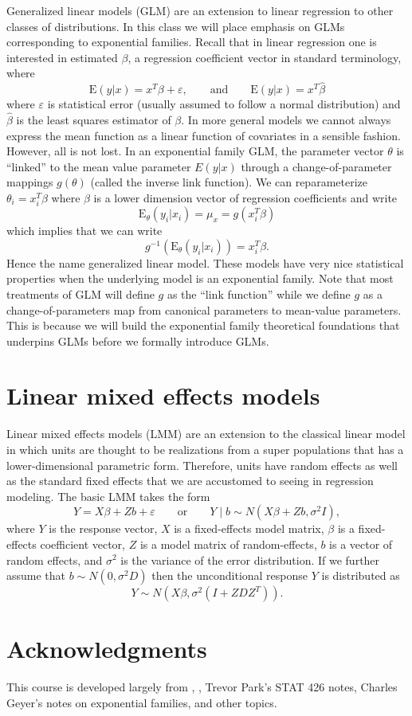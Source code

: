 \documentclass[12pt]{article}
\newcommand{\E}{\mathrm{E}}
\DeclareMathOperator{\E}{E}
\begin{document}
Generalized linear models (GLM) are an extension to linear regression to other classes of distributions. In this class we will place emphasis on GLMs corresponding to exponential families. Recall that in linear regression one is interested in estimated $\beta$, a regression coefficient vector in standard terminology, where 
$$
  \E(y|x) = x^T\beta + \varepsilon, 
    \qquad \text{and} \qquad 
  \hat{\E}(y|x) = x^T\hat\beta
$$
where $\varepsilon$ is statistical error (usually assumed to follow a normal distribution) and $\hat\beta$ is the least squares estimator of $\beta$. In more general models we cannot always express the mean function as a linear function of covariates in a sensible fashion. However, all is not lost. In an exponential family GLM, the parameter vector $\theta$ is ``linked'' to the mean value parameter $E(y|x)$ through a change-of-parameter mappings $g(\theta)$ (called the inverse link function). We can reparameterize $\theta_i = x_i^T\beta$ where $\beta$ is a lower dimension vector of regression coefficients and write
$$
 \E_\theta(y_i|x_i) = \mu_x = g(x_i^T\beta) 
$$
which implies that we can write
$$
  g^{-1}\left(\E_\theta(y_i|x_i)\right) = x_i^T\beta.
$$
Hence the name generalized linear model. These models have very nice statistical properties when the underlying model is an exponential family. Note that most treatments of GLM will define $g$ as the ``link function'' while we define $g$ as a change-of-parameters map from canonical parameters to mean-value parameters. This is because we will build the exponential family theoretical foundations that underpins GLMs before we formally introduce GLMs.


\section*{Linear mixed effects models}

Linear mixed effects models (LMM) are an extension to the classical linear model in which units are thought to be realizations from a super populations that has a lower-dimensional parametric form. Therefore, units have random effects as well as the standard fixed effects that we are accustomed to seeing in regression modeling. The basic LMM takes the form
$$
  Y = X\beta + Zb + \varepsilon \qquad \text{or} \qquad Y\mid b \sim N(X\beta + Zb, \sigma^2I),
$$
where $Y$ is the response vector, $X$ is a fixed-effects model matrix, $\beta$ is a fixed-effects coefficient vector, $Z$ is a model matrix of random-effects, $b$ is a vector of random effects, and $\sigma^2$ is the variance of the error distribution. If we further assume that $b \sim N(0, \sigma^2D)$ then the unconditional response $Y$ is distributed as 
$$
  Y \sim N(X\beta, \sigma^2(I + ZDZ^T)).
$$


\section*{Acknowledgments}

This course is developed largely from \cite{agresti2013cat}, \cite{faraway2016extending}, Trevor Park’s STAT 426 notes, Charles Geyer’s notes on exponential families, and other topics. 




\end{document}

